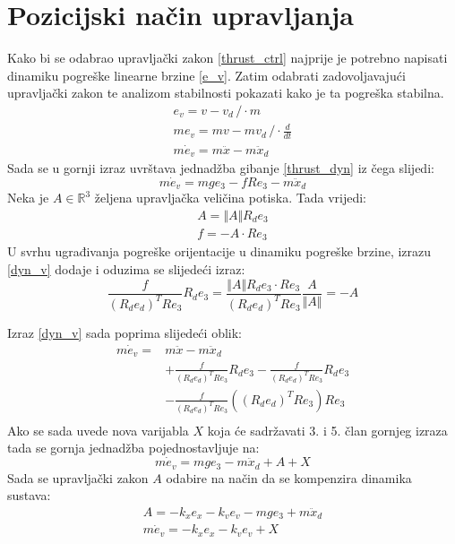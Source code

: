 \documentclass[times, utf8, diplomski]{fer}
\begin{document}
	\section{Pozicijski način upravljanja}
	Kako bi se odabrao upravljački zakon \ref{thrust_ctrl} najprije je potrebno napisati dinamiku pogreške linearne brzine \ref{e_v}. Zatim odabrati zadovoljavajući upravljački zakon te analizom stabilnosti pokazati kako je ta pogreška stabilna. 
	\begin{gather*}
		e_v = v - v_d \,/ \cdot m \\
		me_v = mv - mv_d \, / \cdot \frac{d}{dt} \\
		m\dot{e}_v = m \ddot{x} - m\ddot{x}_d
	\end{gather*}
	Sada se u gornji izraz uvrštava jednadžba gibanje \ref{thrust_dyn} iz čega slijedi:
	\begin{equation}
		m\dot{e}_v = mge_3 - fRe_3 - m\ddot{x}_d \label{dyn_v}
	\end{equation}
	Neka je $A\in\mathbb{R}^3$ željena upravljačka veličina potiska. Tada vrijedi:
	\begin{gather}
		A = \Vert A \Vert R_d e_3 \\
		f = - A \cdot Re_3
	\end{gather}
	U svrhu ugrađivanja pogreške orijentacije u dinamiku pogreške brzine, izrazu \ref{dyn_v} dodaje i oduzima se slijedeći izraz:
	\begin{equation}
		\frac{f}{(R_de_d)^TRe_3}R_d e_3 = \frac{\Vert A \Vert R_d e_3 \cdot Re_3}{(R_de_d)^TRe_3}\frac{A}{\Vert A \Vert} = - A
	\end{equation}
	
	Izraz \ref{dyn_v} sada poprima slijedeći oblik:
	\begin{align*}
		m\dot{e}_v =& m \ddot{x} - m\ddot{x}_d \\
		& + \frac{f}{(R_de_d)^TRe_3}R_d e_3 - \frac{f}{(R_de_d)^TRe_3}R_d e_3 \\
		& - \frac{f}{(R_de_d)^TRe_3}((R_de_d)^TRe_3)Re_3 \\
	\end{align*}
	Ako se sada uvede nova varijabla $X$ koja će sadržavati 3. i 5. član gornjeg izraza tada se gornja jednadžba pojednostavljuje na:
	\begin{equation*}
		m\dot{e}_v = mge_3 - m\ddot{x}_d + A + X
	\end{equation*}
	Sada se upravljački zakon $A$ odabire na način da se kompenzira dinamika sustava: 
	\begin{gather}
		A = -k_x e_x - k_ve_v - mge_3 + m\ddot{x}_d \\
		m\dot{e}_v = -k_x e_x - k_v e_v + X \label{lin_dyn}
	\end{gather}
	
\end{document}
